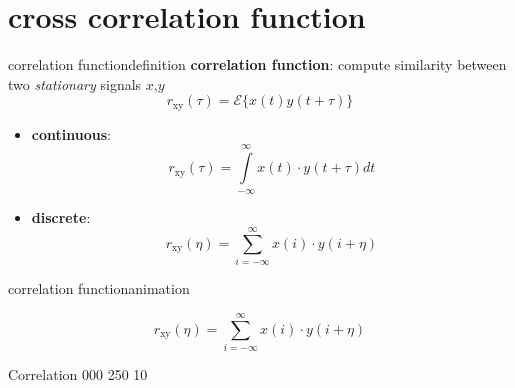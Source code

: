    \section[CCF]{cross correlation function}
        \begin{frame}{correlation function}{definition}
            \textbf{correlation function}: compute similarity between two \textit{stationary} signals $x$,$y$
            \begin{equation*}
                r_\mathrm{xy}(\tau)=\mathcal{E}\lbrace x(t)y(t+\tau)\rbrace  
            \end{equation*}  
            
            \begin{itemize}
                \item	\textbf{continuous}:
                    \begin{equation*}
                        r_\mathrm{xy}(\tau) = \int\limits_{-\infty}^{\infty}{x(t)\cdot y(t+\tau)dt}
                    \end{equation*}
                \item	\textbf{discrete}:
                    \begin{equation*}
                        r_\mathrm{xy}(\eta) = \sum\limits_{i=-\infty}^{\infty}{x(i)\cdot y(i+\eta)}
                    \end{equation*}
            \end{itemize}
        \end{frame}	

        \begin{frame}{correlation function}{animation}
            \vspace{-5mm}
            \begin{footnotesize}
                    \begin{equation*}
                        r_\mathrm{xy}(\eta) = \sum\limits_{i=-\infty}^{\infty}{x(i)\cdot y(i+\eta)}
                    \end{equation*}
            \end{footnotesize}
                {Correlation}
                {000}
                {250}
                {10}
        \end{frame}

